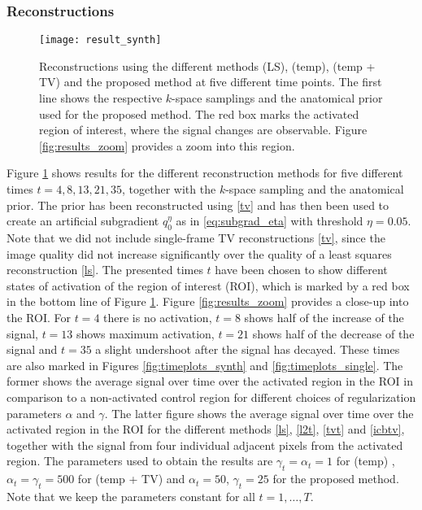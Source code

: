 \subsubsection{Reconstructions}
\begin{figure}[ht!]
	\texttt{[image: result\_synth]}
    \caption{Reconstructions using the different methods (LS), (temp), (temp + TV) and the proposed method at five different time points.
    The first line shows the respective $k$-space samplings and the anatomical prior used for the proposed method.
    The red box marks the activated region of interest, where the signal changes are observable.
    Figure \ref{fig:results_zoom} provides a zoom into this region.}
    \label{fig:results_synth}
\end{figure}
%
Figure \ref{fig:results_synth} shows results for the different reconstruction methods for five different times $t= 4,8,13,21,35$, together with the $k$-space sampling and the anatomical prior. 
The prior has been reconstructed using \eqref{tv} and has then been used to create an artificial subgradient $q_0^\eta$ as in \eqref{eq:subgrad_eta} with threshold $\eta = 0.05$.
Note that we did not include single-frame TV reconstructions \eqref{tv}, since the image quality did not increase significantly over the quality of a least squares reconstruction \eqref{ls}.
The presented times $t$ have been chosen to show different states of activation of the region of interest (ROI), which is marked by a red box in the bottom line of Figure \ref{fig:results_synth}. 
Figure \ref{fig:results_zoom} provides a close-up into the ROI.
For $t=4$ there is no activation, $t=8$ shows half of the increase of the signal, $t=13$ shows maximum activation, $t=21$ shows half of the decrease of the signal and $t=35$ a slight undershoot after the signal has decayed.
These times are also marked in Figures \ref{fig:timeplots_synth} and \ref{fig:timeplots_single}. 
The former shows the average signal over time over the activated region in the ROI in comparison to a non-activated control region for different choices of regularization parameters $\alpha$ and $\gamma$.
The latter figure shows the average signal over time over the activated region in the ROI for the different methods \eqref{ls}, \eqref{l2t}, \eqref{tvt} and \eqref{icbtv}, together with the signal from four individual adjacent pixels from the activated region.   
The parameters used to obtain the results are $\gamma_t = \alpha_t = 1$ for (temp) , $\alpha_t = \gamma_t = 500$ for (temp + TV) and $\alpha_t = 50$, $\gamma_t = 25$ for the proposed method. 
Note that we keep the parameters constant for all $t = 1, \dots, T$.

